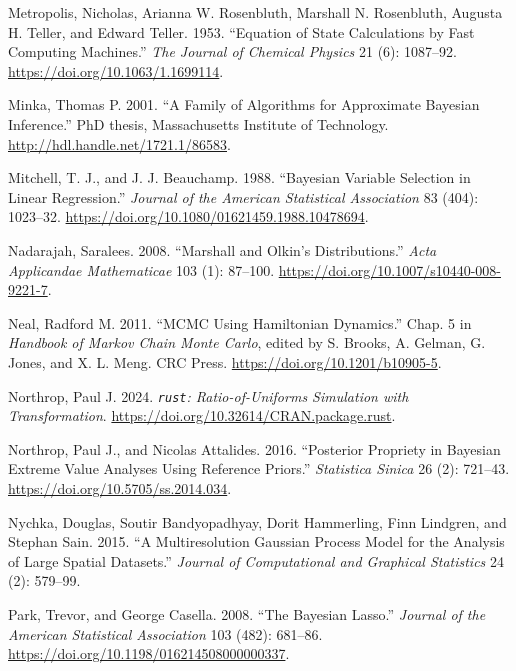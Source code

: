 \documentclass[
  11pt,
  letterpaper,
]{scrbook}
\newlength{\cslhangindent}
\newenvironment{CSLReferences}[2] %
 {\begin{list}{}{%
  \setlength{\itemindent}{0pt}
  \setlength{\leftmargin}{0pt}
  \setlength{\parsep}{0pt}
  \ifodd #1
   \setlength{\leftmargin}{\cslhangindent}
   \setlength{\itemindent}{-1\cslhangindent}
  \fi
  \setlength{\itemsep}{#2\baselineskip}}}
 {\end{list}}
\theoremstyle{definition}
\theoremstyle{plain}
\theoremstyle{plain}
\theoremstyle{plain}
\theoremstyle{definition}
\theoremstyle{definition}
\theoremstyle{plain}
\theoremstyle{plain}
\theoremstyle{remark}
\begin{document}
\begin{CSLReferences}{1}{1}
Metropolis, Nicholas, Arianna W. Rosenbluth, Marshall N. Rosenbluth,
Augusta H. Teller, and Edward Teller. 1953. {``Equation of State
Calculations by Fast Computing Machines.''} \emph{The Journal of
Chemical Physics} 21 (6): 1087--92.
\url{https://doi.org/10.1063/1.1699114}.

Minka, Thomas P. 2001. {``A Family of Algorithms for Approximate
{B}ayesian Inference.''} PhD thesis, Massachusetts Institute of
Technology. \url{http://hdl.handle.net/1721.1/86583}.

Mitchell, T. J., and J. J. Beauchamp. 1988. {``Bayesian Variable
Selection in Linear Regression.''} \emph{Journal of the American
Statistical Association} 83 (404): 1023--32.
\url{https://doi.org/10.1080/01621459.1988.10478694}.

Nadarajah, Saralees. 2008. {``{M}arshall and {O}lkin's Distributions.''}
\emph{Acta Applicandae Mathematicae} 103 (1): 87--100.
\url{https://doi.org/10.1007/s10440-008-9221-7}.

Neal, Radford M. 2011. {``{MCMC} Using {H}amiltonian Dynamics.''} Chap.
5 in \emph{Handbook of {M}arkov Chain {M}onte {C}arlo}, edited by S.
Brooks, A. Gelman, G. Jones, and X. L. Meng. CRC Press.
\url{https://doi.org/10.1201/b10905-5}.

Northrop, Paul J. 2024. \emph{\texttt{rust}: Ratio-of-Uniforms
Simulation with Transformation}.
\url{https://doi.org/10.32614/CRAN.package.rust}.

Northrop, Paul J., and Nicolas Attalides. 2016. {``Posterior Propriety
in {B}ayesian Extreme Value Analyses Using Reference Priors.''}
\emph{Statistica Sinica} 26 (2): 721--43.
\url{https://doi.org/10.5705/ss.2014.034}.

Nychka, Douglas, Soutir Bandyopadhyay, Dorit Hammerling, Finn Lindgren,
and Stephan Sain. 2015. {``A Multiresolution {G}aussian Process Model
for the Analysis of Large Spatial Datasets.''} \emph{Journal of
Computational and Graphical Statistics} 24 (2): 579--99.

Park, Trevor, and George Casella. 2008. {``The {B}ayesian {L}asso.''}
\emph{Journal of the American Statistical Association} 103 (482):
681--86. \url{https://doi.org/10.1198/016214508000000337}.


\end{CSLReferences}
\end{document}
